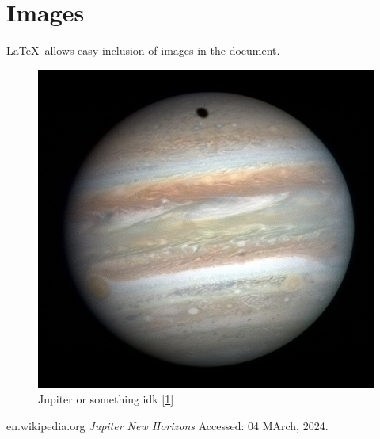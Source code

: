 \documentclass{article}
\begin{document}
\section{Images}
\LaTeX\ allows easy inclusion of images in the document.

\begin{figure}[htbp]
    \centering
    \includegraphics[scale=0.3]{Jupiter_New_Horizons.jpg}
    \caption{Jupiter or something idk [\ref{jupiter}]}
    \label{jupiter}
\end{figure}

\begin{thebibliography}{9}
    en.wikipedia.org  \emph{Jupiter New Horizons}
    Accessed: 04 MArch, 2024.
\end{thebibliography}
\end{document}
